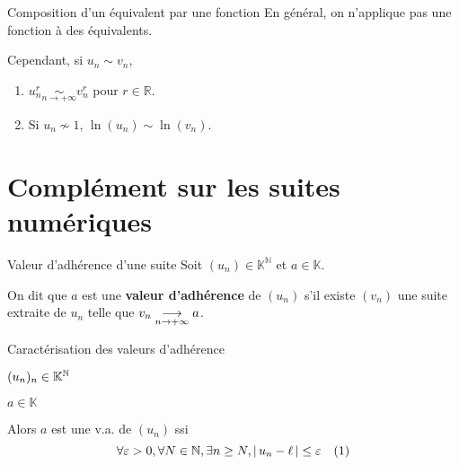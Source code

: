     \begin{prop}{Composition d’un équivalent par une fonction}{}
        En général, on n’applique pas une fonction à des équivalents.

        Cependant, si $u_n \sim v_n$,
        \begin{enumerate}
            \item $u_n^r \underset{n \rightarrow + \infty}{\sim} v_n^r$ pour $r \in \mathbb{R}$.
            \item Si $u_n \not\sim 1$, $\ln(u_n) \sim \ln(v_n)$.
        \end{enumerate}
    \end{prop}

\section{Complément sur les suites numériques}

    \begin{defi}{Valeur d’adhérence d’une suite}{}
        Soit $(u_n) \in \mathbb{K}^{\mathbb{N}}$ et $a \in \mathbb{K}$.

        On dit que $a$ est une \textbf{valeur d’adhérence} de $(u_n)$ s’il existe $(v_n)$ une suite extraite de $u_n$ telle que $v_n \underset{n \rightarrow +\infty}{\longrightarrow} a$.
    \end{defi}

    \begin{prop}{Caractérisation des valeurs d’adhérence}{}
        \begin{soient}
            \item $(u_n)_n \in \mathbb{K}^{\mathbb{N}}$
            \item $a \in \mathbb{K}$
        \end{soient}
        Alors $a$ est une v.a. de $(u_n)$ ssi \[ \forall \varepsilon > 0, \forall N \in \mathbb{N}, \exists n \geq N, \left\lvert \,u_n - \ell \, \right\rvert \leq \varepsilon \quad (1) \] 
    \end{prop}

